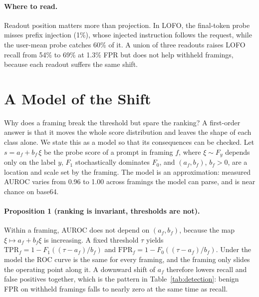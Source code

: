 \documentclass[11pt]{article}
\begin{document}
\paragraph{Where to read.}
Readout position matters more than projection. In LOFO, the final-token probe misses prefix injection (1\%), whose injected instruction follows the request, while the user-mean probe catches 60\% of it. A union of three readouts raises LOFO recall from 54\% to 69\% at 1.3\% FPR but does not help withheld framings, because each readout suffers the same shift.

\section{A Model of the Shift}
\label{sec:theory}

Why does a framing break the threshold but spare the ranking? A first-order answer is that it moves the whole score distribution and leaves the shape of each class alone. We state this as a model so that its consequences can be checked. Let $s=a_f+b_f\,\xi$ be the probe score of a prompt in framing $f$, where $\xi\sim F_y$ depends only on the label $y$, $F_1$ stochastically dominates $F_0$, and $(a_f,b_f)$, $b_f>0$, are a location and scale set by the framing. The model is an approximation: measured AUROC varies from 0.96 to 1.00 across framings the model can parse, and is near chance on base64.

\paragraph{Proposition 1 (ranking is invariant, thresholds are not).}
Within a framing, AUROC does not depend on $(a_f,b_f)$, because the map $\xi\mapsto a_f+b_f\xi$ is increasing. A fixed threshold $\tau$ yields $\mathrm{TPR}_f=1-F_1((\tau-a_f)/b_f)$ and $\mathrm{FPR}_f=1-F_0((\tau-a_f)/b_f)$. Under the model the ROC curve is the same for every framing, and the framing only slides the operating point along it. A downward shift of $a_f$ therefore lowers recall and false positives together, which is the pattern in Table~\ref{tab:detection}: benign FPR on withheld framings falls to nearly zero at the same time as recall.
\end{document}
